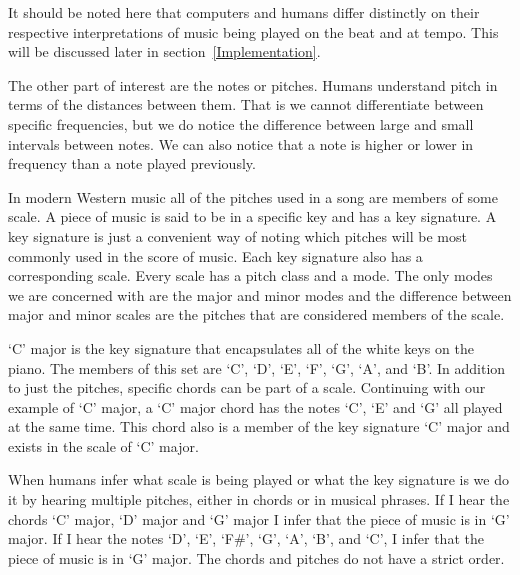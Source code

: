 \documentclass[12pt]{ucthesis}
\begin{document}
It should be noted here that computers and humans differ distinctly on their respective interpretations of music being played on the beat and at tempo. This will be discussed later in section~\ref{Implementation}.

The other part of interest are the notes or pitches. Humans understand pitch in terms of the distances between them. That is we cannot differentiate between specific frequencies, but we do notice the difference between large and small intervals between notes. We can also notice that a note is higher or lower in frequency than a note played previously. 

In modern Western music all of the pitches used in a song are members of some scale. A piece of music is said to be in a specific key and has a key signature. A key signature is just a convenient way of noting which pitches will be most commonly used in the score of music. Each key signature also has a corresponding scale. Every scale has a pitch class and a mode. The only modes we are concerned with are the major and minor modes and the difference between major and minor scales are the pitches that are considered members of the scale.


`C' major is the key signature that encapsulates all of the white keys on the piano. The members of this set are `C', `D', `E', `F', `G', `A', and `B'. In addition to just the pitches, specific chords can be part of a scale. Continuing with our example of `C' major, a `C' major chord has the notes `C', `E' and `G' all played at the same time. This chord also is a member of the key signature `C' major and exists in the scale of `C' major. 

When humans infer what scale is being played or what the key signature is we do it by hearing multiple pitches, either in chords or in musical phrases. If I hear the chords `C' major, `D' major and `G' major I infer that the piece of music is in `G' major. If I hear the notes `D', `E', `F\#', `G', `A', `B', and `C', I infer that the piece of music is in `G' major. The chords and pitches do not have a strict order. 
\end{document}
